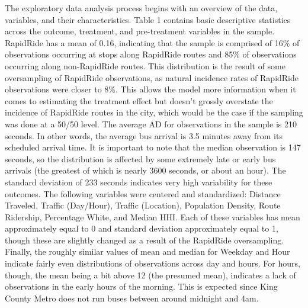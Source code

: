 \documentclass[
  12pt,
]{article}
\begin{document}
The exploratory data analysis process begins with an overview of the
data, variables, and their characteristics. Table 1 contains basic
descriptive statistics across the outcome, treatment, and pre-treatment
variables in the sample. RapidRide has a mean of 0.16, indicating that
the sample is comprised of 16\% of observations occurring at stops along
RapidRide routes and 85\% of observations occurring along non-RapidRide
routes. This distribution is the result of some oversampling of
RapidRide observations, as natural incidence rates of RapidRide
observations were closer to 8\%. This allows the model more information
when it comes to estimating the treatment effect but doesn't grossly
overstate the incidence of RapidRide routes in the city, which would be
the case if the sampling was done at a 50/50 level. The average AD for
observations in the sample is 210 seconds. In other words, the average
bus arrival is 3.5 minutes away from its scheduled arrival time. It is
important to note that the median observation is 147 seconds, so the
distribution is affected by some extremely late or early bus arrivals
(the greatest of which is nearly 3600 seconds, or about an hour). The
standard deviation of 233 seconds indicates very high variability for
these outcomes. The following variables were centered and standardized:
Distance Traveled, Traffic (Day/Hour), Traffic (Location), Population
Density, Route Ridership, Percentage White, and Median HHI. Each of
these variables has mean approximately equal to 0 and standard deviation
approximately equal to 1, though these are slightly changed as a result
of the RapidRide oversampling. Finally, the roughly similar values of
mean and median for Weekday and Hour indicate fairly even distributions
of observations across day and hours. For hours, though, the mean being
a bit above 12 (the presumed mean), indicates a lack of observations in
the early hours of the morning. This is expected since King County Metro
does not run buses between around midnight and 4am.
\end{document}
